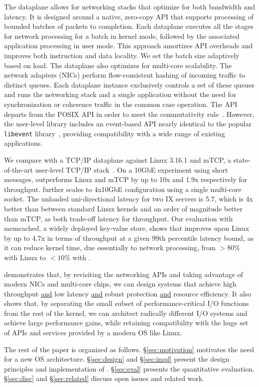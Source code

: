 The \ix dataplane allows for networking stacks that optimize for both
bandwidth and latency. It is designed around a native, zero-copy API
that supports processing of bounded batches of packets to
completion. Each dataplane executes all the stages for network
processing for a batch in kernel mode, followed by the associated
application processing in user mode. This approach amortizes API
overheads and improves both instruction and data locality. We set the
batch size adaptively based on load. The \ix dataplane also optimizes
for multi-core scalability.  The network adapters (NICs) perform
flow-consistent hashing of incoming traffic to distinct queues. Each
dataplane instance exclusively controls a set of these queues and runs
the networking stack and a single application without the need for
synchronization or coherence traffic in the common case operation. The
\ix API departs from the POSIX API in order to meet the commutativity
rule~\cite{DBLP:conf/sosp/ClementsKZMK13}.  However, the \ix
user-level library includes an event-based API nearly identical to the
popular \texttt{libevent} library~\cite{provos2003libevent}, providing
compatibility with a wide range of existing applications.

We compare \ix with a TCP/IP dataplane against Linux
3.16.1 and mTCP, a state-of-the-art user-level TCP/IP
stack~\cite{jeong2014mtcp}.  On a 10GbE experiment using short messages, \ix outperforms Linux and mTCP by up to
10x and 1.9x respectively for throughput. \ix
further scales to 4x10GbE configuration using a single multi-core socket.
The unloaded uni-directional latency for two IX servers is
5.7\microsecond, which is 4x better than between standard
Linux kernels and an order of magnitude better than mTCP, as both
trade-off latency for throughput.  Our evaluation with memcached, a
widely deployed key-value store, shows that \ix improves upon Linux by
up to 4.7x in terms of throughput at a given 99th
percentile latency bound, as it can reduce kernel time, due
essentially to network processing, from $>80\%$ with Linux to
$<10\%$ with \ix.

\ix demonstrates that, by revisiting the networking APIs and taking
advantage of modern NICs and multi-core chips, we can design systems
that achieve high throughput \underline{and} low latency
\underline{and} robust protection \underline{and} resource
efficiency. It also shows that, by separating the small subset of
performance-critical I/O functions from the rest of the kernel, we can
architect radically different I/O systems and achieve large
performance gains, while retaining compatibility with the huge set of
APIs and services provided by a modern OS like Linux.

The rest of the paper is organized as follows. \S\ref{sec:motivation}
motivates the need for a new OS architecture. \S\ref{sec:design} and
\S\ref{sec:impl} present the design principles and implementation of
\ix.  \S\ref{sec:eval} presents the quantitative
evaluation. \S\ref{sec:disc} and \S\ref{sec:related} discuss open
issues and related work.



